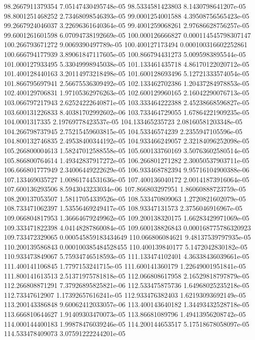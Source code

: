 {98.2667911379354 7.05147430495748e-05
98.5334581423803 8.1430798641207e-05
98.8001251468252 2.73468098546393e-05
99.0001254001588 4.39508756565423e-05
99.2667924046037 3.22696361640364e-05
99.4001259068261 2.97686628756257e-05
99.6001261601598 6.07094738192669e-05
100.000126666827 0.000114545798307147
100.266793671272 9.0069390497789e-05
100.400127173494 0.000100316602252861
100.666794177939 3.89061847117605e-05
100.866794431273 5.0095983895544e-05
101.000127933495 5.33049998945038e-05
101.133461435718 4.86170122020712e-05
101.400128440163 3.20114973218498e-05
101.600128693496 5.12721333574054e-05
101.866795697941 2.56675536309492e-05
102.133462702386 1.20437284978853e-05
102.400129706831 1.97105362976263e-05
102.600129960165 2.16042290076713e-05
103.066797217943 2.62524222640871e-05
103.333464222388 2.45238668596827e-05
103.600131226833 8.40381702992602e-06
103.733464729055 1.67864221909235e-05
104.0001317335 2.19769778423537e-05
104.133465235723 2.08160581203348e-05
104.266798737945 2.75215459603815e-05
104.53346574239 2.2355947105596e-05
104.800132746835 2.49538400344192e-05
104.933466249057 2.32184096252098e-05
105.266800004613 1.58247012588558e-05
105.600133760169 3.50763602580514e-05
105.866800764614 1.49342837917272e-05
106.266801271282 2.30050537903711e-05
106.666801777949 2.34006449222629e-05
106.933468782394 9.95716104900388e-06
107.133469035727 1.00861744531636e-05
107.400136040172 2.00141873916064e-05
107.600136293506 8.5943043233034e-06
107.866803297951 1.86060888723759e-05
108.200137053507 1.58117054339526e-05
108.533470809063 1.2720821602079e-05
108.733471062397 1.53556469249417e-05
108.93347131573 2.3756046916967e-05
109.066804817953 1.36664679249962e-05
109.200138320175 1.66283429971069e-05
109.333471822398 4.04148287860084e-05
109.600138826843 0.000168775786320923
109.733472329065 0.000545859183434649
110.066806084621 9.48137539797935e-05
110.200139586843 0.000100385484528455
110.400139840177 5.1472042830182e-05
110.933473849067 5.75934746518593e-05
111.133474102401 4.36338436039661e-05
111.400141106845 1.7797153241715e-05
111.600141360179 1.22649001951841e-05
111.800141613513 2.51371975781818e-05
112.066808617958 2.16529818797879e-05
112.266808871291 7.37926895825821e-06
112.533475875736 1.64968025235218e-05
112.73347612907 1.17392657616241e-05
112.933476382403 1.62193093692149e-05
113.200143386848 9.60062412033057e-06
113.400143640182 1.34493432528718e-05
113.666810644627 1.91409303470073e-05
113.86681089796 1.49413956208742e-05
114.000144400183 1.99878476039246e-05
114.200144653517 5.17518678058097e-05
114.533478409073 3.07591222244201e-05
}
